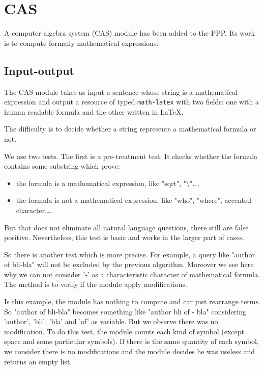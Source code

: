 \newcommand{\CalChAS}{\text{C}\hspace{-2pt}_{\text{AL}}\hspace{-3pt}\text{C}^{\text{H}}{\hspace{-4pt}}_\text{AS}}
\newcommand{\RR}{\mathbb{R}}
\newcommand{\CC}{\mathbb{C}}
\newcommand{\ZZ}{\mathbb{Z}}
\newcommand{\NN}{\mathbb{N}}
\newcommand{\dd}{\mathrm{d}}


\section{CAS}

A computer algebra system (CAS) module has been added to the PPP. Its work is to compute formally mathematical expressions.

\subsection{Input-output}

The CAS module takes as input a sentence whose string is a mathematical expression and output a resource of typed \texttt{math-latex} with two fields: one with a human readable formula and the other written in \LaTeX.

The difficulty is to decide whether a string represents a mathematical formula or not.

We use two tests. The first is a pre-treatment test. It checks whether the formula contains some substring which prove:
\begin{itemize}
    \item the formula is a mathematical expression, like "sqrt", "\textbackslash"\ldots,
    \item the formula is not a mathematical expression, like "who", "where", accented character\ldots.
\end{itemize}

But that does not eliminate all natural language questions, there still are false positive. Nevertheless, this test is basic and works in the larger part of cases.

\bigskip

So there is another test which is more precise. For example, a query like "author of bli-bla" will not be excluded by the previous algorithm. Moreover we see here why we can not consider '-' as a characteristic character of mathematical formula. The method is to verify if the module apply modifications.

Is this example, the module has nothing to compute and car just rearrange terms. So "author of bli-bla" becomes something like "author bli of - bla" considering 'author', 'bli', 'bla' and 'of' as variable. But we observe there was no modification. To do this test, the module counts each kind of symbol (except space and some particular symbols). If there is the same quantity of each symbol, we consider there is no modifications and the module decides he was useless and returns an empty list.

